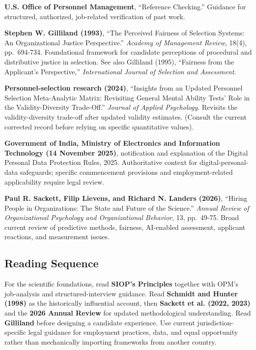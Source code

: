 \begin{enumerate}[leftmargin=*,label={[\textbf{R\arabic*}]}]
\item \textbf{U.S. Office of Personnel Management}, ``Reference Checking.'' Guidance for structured, authorized, job-related verification of past work.

\item \textbf{Stephen W. Gilliland (1993)}, ``The Perceived Fairness of Selection Systems: An Organizational Justice Perspective.'' \textit{Academy of Management Review}, 18(4), pp.~694-734. Foundational framework for candidate perceptions of procedural and distributive justice in selection. See also Gilliland (1995), ``Fairness from the Applicant's Perspective,'' \textit{International Journal of Selection and Assessment}.

\item \textbf{Personnel-selection research (2024)}, ``Insights from an Updated Personnel Selection Meta-Analytic Matrix: Revisiting General Mental Ability Tests' Role in the Validity-Diversity Trade-Off.'' \textit{Journal of Applied Psychology}. Revisits the validity-diversity trade-off after updated validity estimates. (Consult the current corrected record before relying on specific quantitative values).

\item \textbf{Government of India, Ministry of Electronics and Information Technology (14 November 2025)}, notification and explanation of the Digital Personal Data Protection Rules, 2025. Authoritative context for digital-personal-data safeguards; specific commencement provisions and employment-related applicability require legal review.

\item \textbf{Paul R. Sackett, Filip Lievens, and Richard N. Landers (2026)}, ``Hiring People in Organizations: The State and Future of the Science.'' \textit{Annual Review of Organizational Psychology and Organizational Behavior}, 13, pp.~49-75. Broad current review of predictive methods, fairness, AI-enabled assessment, applicant reactions, and measurement issues.
\end{enumerate}

\subsection*{Reading Sequence}

For the scientific foundations, read \textbf{SIOP's Principles} together with OPM's job-analysis and structured-interview guidance. Read \textbf{Schmidt and Hunter (1998)} as the historically influential account, then \textbf{Sackett et al. (2022, 2023)} and the \textbf{2026 Annual Review} for updated methodological understanding. Read \textbf{Gilliland} before designing a candidate experience. Use current jurisdiction-specific legal guidance for employment practices, data, and equal opportunity rather than mechanically importing frameworks from another country.

